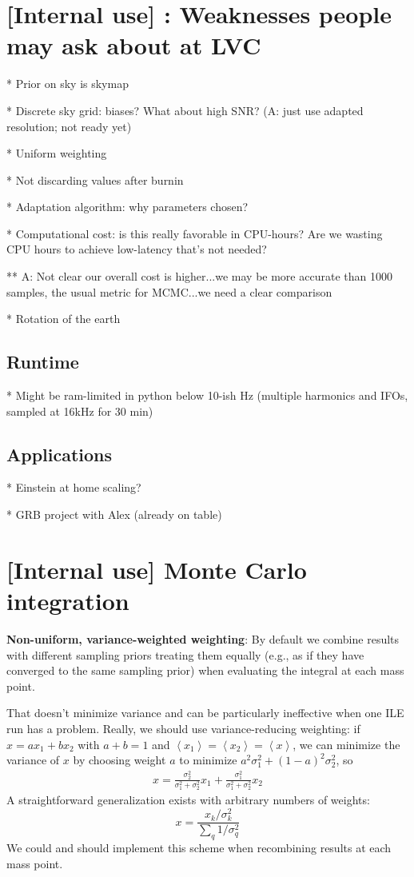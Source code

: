 \section{[Internal use] : Weaknesses people may ask about at LVC}

* Prior on sky is skymap

* Discrete sky grid: biases? What about high SNR? (A: just use adapted resolution; not ready yet)

* Uniform weighting

* Not discarding values after burnin

* Adaptation algorithm: why parameters chosen?

* Computational cost: is this really favorable in CPU-hours?  Are we wasting CPU hours to achieve low-latency that's not needed?

** A: Not clear our overall cost is higher...we may be more accurate than 1000 samples, the usual metric for MCMC...we need a clear comparison

* Rotation of the earth

\subsection{Runtime}

* Might be ram-limited in python below 10-ish Hz (multiple harmonics and IFOs, sampled at 16kHz for 30 min)

\subsection{Applications}

* Einstein at home scaling?

* GRB project with Alex (already on table)


\section{[Internal use] Monte Carlo integration}

\textbf{Non-uniform, variance-weighted weighting}: By default we combine results with different sampling priors treating
them equally (e.g., as if they have converged to the same sampling prior) when evaluating the integral at each mass
point.  

That doesn't minimize variance and can be particularly
ineffective when one ILE run has a problem.  Really, we should use variance-reducing weighting: if $x=ax_1 +b x_2$ with $a+b=1$ and
$\left<x_1\right> =\left<x_2\right> =\left<x\right>$, we can minimize the variance of $x$ by choosing weight $a$ to
minimize $a^2 \sigma_1^2 + (1-a)^2 \sigma_2^2$, so 
\begin{eqnarray}
x = \frac{\sigma_2^2}{\sigma_1^2+\sigma_2^2} x_1 +  \frac{\sigma_1^2}{\sigma_1^2+\sigma_2^2} x_2
\end{eqnarray}
A straightforward generalization exists with arbitrary numbers of weights:
\[
x = \frac{x_k/\sigma_k^2}{\sum_q 1/\sigma_q^2}
\]
We could and should implement this scheme when recombining results at each mass point. 

